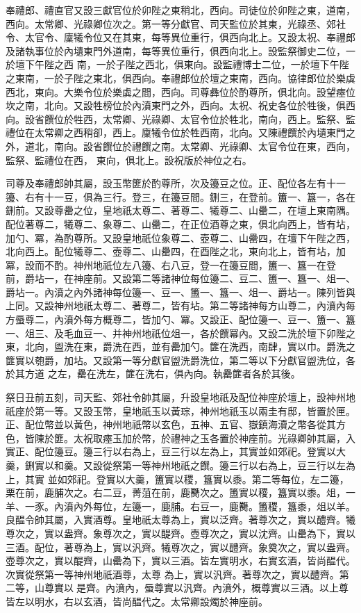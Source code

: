 \begin{pinyinscope}
 奉禮郎、禮直官又設三獻官位於卯陛之東稍北，西向。司徒位於卯陛之東，道南，西向。太常卿、光祿卿位次之。第一等分獻官、司天監位於其東，光祿丞、郊社令、太官令、廩犧令位又在其東，每等異位重行，俱西向北上。又設太祝、奉禮郎及諸執事位於內壝東門外道南，每等異位重行，俱西向北上。設監祭御史二位，一於壇下午陛之西
 南，一於子陛之西北，俱東向。設監禮博士二位，一於壇下午陛之東南，一於子陛之東北，俱西向。奉禮郎位於壇之東南，西向。協律郎位於樂虡西北，東向。大樂令位於樂虡之間，西向。司尊彝位於酌尊所，俱北向。設望瘞位坎之南，北向。又設牲榜位於內濆東門之外，西向。太祝、祝史各位於牲後，俱西向。設省饌位於牲西，太常卿、光祿卿、太官令位於牲北，南向，西上。監祭、監禮位在太常卿之西稍卻，西上。廩犧令位於牲西南，北向。又陳禮饌於內壝東門之外，道北，南向。設省饌位於禮饌之南。太常卿、光祿卿、太官令位在東，西向，監祭、監禮位在西，
 東向，俱北上。設祝版於神位之右。



 司尊及奉禮郎帥其屬，設玉幣篚於酌尊所，次及籩豆之位。正、配位各左有十一籩、右有十一豆，俱為三行。登三，在籩豆間。鉶三，在登前。簠一、簋一，各在鉶前。又設尊罍之位，皇地祇太尊二、著尊二、犧尊二、山罍二，在壇上東南隅。配位著尊二，犧尊二、象尊二、山罍二，在正位酒尊之東，俱北向西上，皆有坫，加勺、冪，為酌尊所。又設皇地祇位象尊二、壺尊二、山罍四，在壇下午陛之西，北向西上。配位犧尊二、壺尊二、山罍四，在酉陛之北，東向北上，皆有坫，加冪，設而不酌。神州地祇位左八籩、右八豆，登一在籩豆間，簠一、簋一在登
 前，爵坫一，在神座前。又設第二等諸神位每位籩二、豆二、簠一、簋一、俎一、爵坫一。內濆之內外諸神每位籩一、豆一、簠一、簋一、俎一、爵坫一。陳列皆與上同。又設神州地祇太尊二、著尊二，皆有坫。第二等諸神每方山尊二，內濆內每方蜃尊二，內濆外每方概尊二，皆加勺、冪。又設正、配位籩一、豆一、簠一、簋一、俎三、及毛血豆一、并神州地祇位俎一，各於饌冪內。又設二洗於壇下卯陛之東，北向，盥洗在東，爵洗在西，並有罍加勺。篚在洗西，南肆，實以巾。爵洗之篚實以匏爵，加坫。又設第一等分獻官盥洗爵洗位，第二等以下分獻官盥洗位，各於其方道
 之左，罍在洗左，篚在洗右，俱內向。執罍篚者各於其後。



 祭日丑前五刻，司天監、郊社令帥其屬，升設皇地祇及配位神座於壇上，設神州地祇座於第一等。又設玉幣，皇地祇玉以黃琮，神州地祇玉以兩圭有邸，皆置於匣。正、配位幣並以黃色，神州地祇幣以玄色，五神、五官、嶽鎮海瀆之幣各從其方色，皆陳於篚。太祝取瘞玉加於幣，於禮神之玉各置於神座前。光祿卿帥其屬，入實正、配位籩豆。籩三行以右為上，豆三行以左為上，其實並如郊祀。登實以大羹，鉶實以和羹。又設從祭第一等神州地祇之饌。籩三行以右為上，豆三行以左為上，其實
 並如郊祀。登實以大羹，簠實以稷，簋實以黍。第二等每位，左二籩，栗在前，鹿脯次之。右二豆，菁菹在前，鹿臡次之。簠實以稷，簋實以黍。俎，一羊、一豕。內濆內外每位，左籩一，鹿脯。右豆一，鹿臡。簠稷，簋黍，俎以羊。良醖令帥其屬，入實酒尊。皇地祇太尊為上，實以泛齊。著尊次之，實以醴齊。犧尊次之，實以盎齊。象尊次之，實以醍齊。壺尊次之，實以沈齊。山罍為下，實以三酒。配位，著尊為上，實以汎齊。犧尊次之，實以醴齊。象奠次之，實以盎齊。壺尊次之，實以醍齊，山罍為下，實以三酒。皆左實明水，右實玄酒，皆尚醖代。次實從祭第一等神州地祇酒尊，太尊
 為上，實以汎齊。著尊次之，實以醴齊。第二等，山尊實以是齊。內濆內，蜃尊實以汎齊。內濆外，概尊實以三酒。以上尊皆左以明水，右以玄酒，皆尚醖代之。太常卿設燭於神座前。




\end{pinyinscope}
